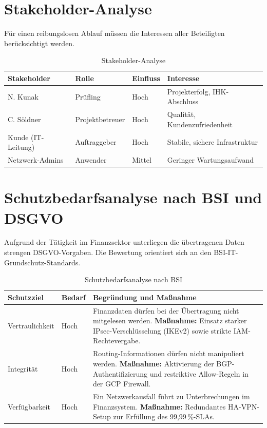 \section{Stakeholder-Analyse}
Für einen reibungslosen Ablauf müssen die Interessen aller Beteiligten berücksichtigt werden.

\begin{table}[!ht]
\centering
\begin{tabularx}{\textwidth}{|l|l|l|X|}
\hline
\textbf{Stakeholder} & \textbf{Rolle} & \textbf{Einfluss} & \textbf{Interesse} \\ \hline
N. Kunak & Prüfling & Hoch & Projekterfolg, IHK-Abschluss \\ \hline
C. Söldner & Projektbetreuer & Hoch & Qualität, Kundenzufriedenheit \\ \hline
Kunde (IT-Leitung) & Auftraggeber & Hoch & Stabile, sichere Infrastruktur \\ \hline
Netzwerk-Admins & Anwender & Mittel & Geringer Wartungsaufwand \\ \hline
\end{tabularx}
\caption{Stakeholder-Analyse}
\end{table}

\section{Schutzbedarfsanalyse nach BSI und DSGVO}
Aufgrund der Tätigkeit im Finanzsektor unterliegen die übertragenen Daten strengen DSGVO-Vorgaben. Die Bewertung orientiert sich an den BSI-IT-Grundschutz-Standards.

\begin{table}[!ht]
\centering
\begin{tabularx}{\textwidth}{|l|l|X|}
\hline
\textbf{Schutzziel} & \textbf{Bedarf} & \textbf{Begründung und Maßnahme} \\ \hline
Vertraulichkeit & Hoch & Finanzdaten dürfen bei der Übertragung nicht mitgelesen werden. \textbf{Maßnahme:} Einsatz starker IPsec-Verschlüsselung (IKEv2) sowie strikte IAM-Rechtevergabe. \\ \hline
Integrität & Hoch & Routing-Informationen dürfen nicht manipuliert werden. \textbf{Maßnahme:} Aktivierung der BGP-Authentifizierung und restriktive Allow-Regeln in der GCP Firewall. \\ \hline
Verfügbarkeit & Hoch & Ein Netzwerkausfall führt zu Unterbrechungen im Finanzsystem. \textbf{Maßnahme:} Redundantes HA-VPN-Setup zur Erfüllung des 99,99\,\%-SLAs. \\ \hline
\end{tabularx}
\caption{Schutzbedarfsanalyse nach BSI}
\end{table}

